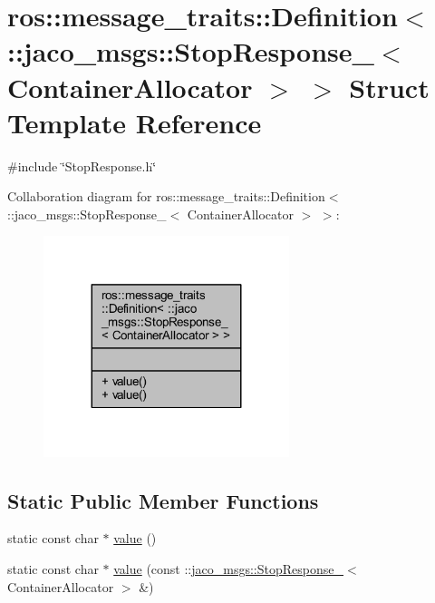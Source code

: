\hypertarget{structros_1_1message__traits_1_1Definition_3_01_1_1jaco__msgs_1_1StopResponse___3_01ContainerAllocator_01_4_01_4}{}\section{ros\+:\+:message\+\_\+traits\+:\+:Definition$<$ \+:\+:jaco\+\_\+msgs\+:\+:Stop\+Response\+\_\+$<$ Container\+Allocator $>$ $>$ Struct Template Reference}
\label{structros_1_1message__traits_1_1Definition_3_01_1_1jaco__msgs_1_1StopResponse___3_01ContainerAllocator_01_4_01_4}


{\ttfamily \#include \char`\"{}Stop\+Response.\+h\char`\"{}}



Collaboration diagram for ros\+:\+:message\+\_\+traits\+:\+:Definition$<$ \+:\+:jaco\+\_\+msgs\+:\+:Stop\+Response\+\_\+$<$ Container\+Allocator $>$ $>$\+:
\nopagebreak
\begin{figure}[H]
\begin{center}
\leavevmode
\includegraphics[width=203pt]{d6/d15/structros_1_1message__traits_1_1Definition_3_01_1_1jaco__msgs_1_1StopResponse___3_01ContainerAllocator_01_4_01_4__coll__graph}
\end{center}
\end{figure}
\subsection*{Static Public Member Functions}
\begin{DoxyCompactItemize}
\item 
static const char $\ast$ \hyperlink{structros_1_1message__traits_1_1Definition_3_01_1_1jaco__msgs_1_1StopResponse___3_01ContainerAllocator_01_4_01_4_a78c4b8af3e823e0e11f515342545d7c5}{value} ()
\item 
static const char $\ast$ \hyperlink{structros_1_1message__traits_1_1Definition_3_01_1_1jaco__msgs_1_1StopResponse___3_01ContainerAllocator_01_4_01_4_abe9d4b02f0bf3e69bad0135eb04208a3}{value} (const \+::\hyperlink{structjaco__msgs_1_1StopResponse__}{jaco\+\_\+msgs\+::\+Stop\+Response\+\_\+}$<$ Container\+Allocator $>$ \&)
\end{DoxyCompactItemize}


